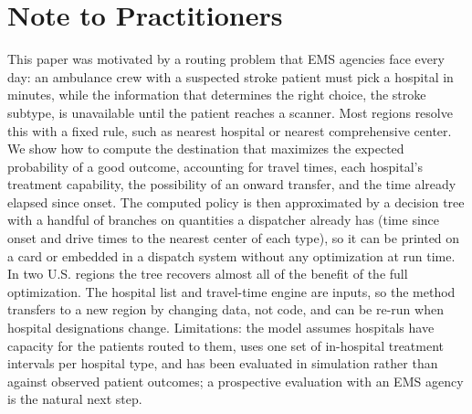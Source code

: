 \begin{abstract}
Emergency medical services (EMS) must choose a destination hospital for a suspected stroke patient within minutes, without knowing the stroke subtype, and the choice determines whether time-critical treatment is reached in time. We formulate this dispatch decision as a Markov decision process (MDP) over patient location, time since symptom onset, and subtype uncertainty, with hospitals classified by on-site capability (endovascular thrombectomy, intravenous thrombolysis, or neither), road travel times from a routing engine, inter-facility transfer, and published in-hospital treatment intervals. The MDP is solved online by depth-two forward search, and the policy is distilled into a shallow decision tree that EMS crews can apply without computation. In 10 replicates of 1,000 simulated patients in the San Francisco Bay Area, the MDP policy raised the mean probability of an excellent 90-day outcome (modified Rankin Scale 0--1) from 0.374 under nearest-hospital routing to 0.403 (paired difference 0.029, 95\% CI 0.028--0.030), with the largest gains far from thrombectomy centers and no systematic loss in well-served areas; a one-split decision tree recovered 99.8\% of this gain. Results were robust to travel-time error, and a routing decision took 18~ms. In Rhode Island the policy matched the state's single-center protocol while distributing load across nine hospitals.
\end{abstract}

\section*{Note to Practitioners}
This paper was motivated by a routing problem that EMS agencies face every day: an ambulance crew with a suspected stroke patient must pick a hospital in minutes, while the information that determines the right choice, the stroke subtype, is unavailable until the patient reaches a scanner. Most regions resolve this with a fixed rule, such as nearest hospital or nearest comprehensive center. We show how to compute the destination that maximizes the expected probability of a good outcome, accounting for travel times, each hospital's treatment capability, the possibility of an onward transfer, and the time already elapsed since onset. The computed policy is then approximated by a decision tree with a handful of branches on quantities a dispatcher already has (time since onset and drive times to the nearest center of each type), so it can be printed on a card or embedded in a dispatch system without any optimization at run time. In two U.S. regions the tree recovers almost all of the benefit of the full optimization. The hospital list and travel-time engine are inputs, so the method transfers to a new region by changing data, not code, and can be re-run when hospital designations change. Limitations: the model assumes hospitals have capacity for the patients routed to them, uses one set of in-hospital treatment intervals per hospital type, and has been evaluated in simulation rather than against observed patient outcomes; a prospective evaluation with an EMS agency is the natural next step.
